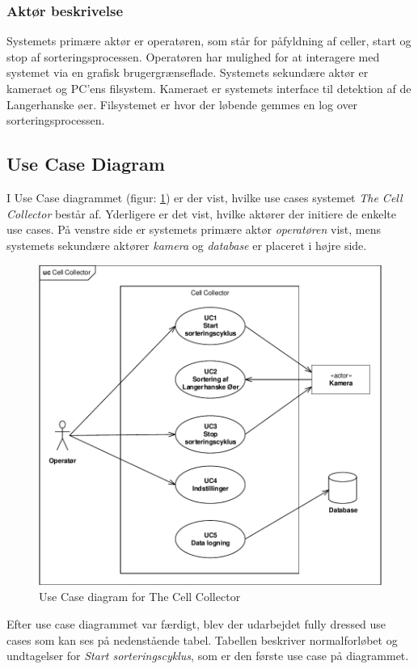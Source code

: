 \subsubsection{Aktør beskrivelse}
Systemets primære aktør er operatøren, som står for påfyldning af celler, start og stop af sorteringsprocessen. Operatøren har mulighed for at interagere med systemet via en grafisk brugergrænseflade. Systemets sekundære aktør er kameraet og PC’ens filsystem. Kameraet er systemets interface til detektion af de Langerhanske øer. Filsystemet er hvor der løbende gemmes en log over sorteringsprocessen.

\subsection{Use Case Diagram}
I Use Case diagrammet (figur: \ref{fig:usecase}) er der vist, hvilke use cases systemet \textit{The Cell Collector} består af. Yderligere er det vist, hvilke aktører der initiere de enkelte use cases. På venstre side er systemets primære aktør \textit{operatøren} vist, mens systemets sekundære aktører \textit{kamera} og \textit{database} er placeret i højre side. 

\begin{figure}[H]
	\centering
	\includegraphics[width=1\textwidth]{billeder/UC_CellCollector.pdf}
	\caption{Use Case diagram for The Cell Collector}
	\label{fig:usecase}
\end{figure}
Efter use case diagrammet var færdigt, blev der udarbejdet fully dressed use cases som kan ses på nedenstående tabel. Tabellen beskriver normalforløbet og undtagelser for \textit{Start sorteringscyklus}, som er den første use case på diagrammet. 
\newpage 

